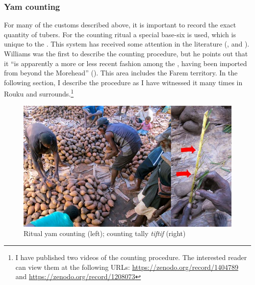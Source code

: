 \subsubsection{Yam counting}\label{yamcounting}

For many of the customs described above, it is important to record the exact quantity of tubers. For the counting ritual a special base-six  is used, which is unique to the . This  system has received some attention in the literature (\citealt{Donohue:2008bn}, \citealt{Hammarstrom:2009bp} and \citealt{Evans:2009wg}). Williams was the first to describe the counting procedure, but he points out that it ``is apparently a more or less recent fashion among the , having been imported from beyond the Morehead'' (\citeyear[225]{Williams:1936transfly}). This area includes the Farem territory. In the following section, I describe the procedure as I have witnessed it many times in Rouku and surrounds.\footnote{I have published two videos of the counting procedure. The interested reader can view them at the following URLs:  {\url{https://zenodo.org/record/1404789}} and {\url{https://zenodo.org/record/1208073}}}

\begin{figure}
    \includegraphics[width=.9\textwidth]{figures/yam3.jpg}
  \caption[Ritual yam counting]{Ritual yam counting (left); counting tally \emph{tiftif} (right)}
  \label{fig:yam3.jpg}
\end{figure}%

